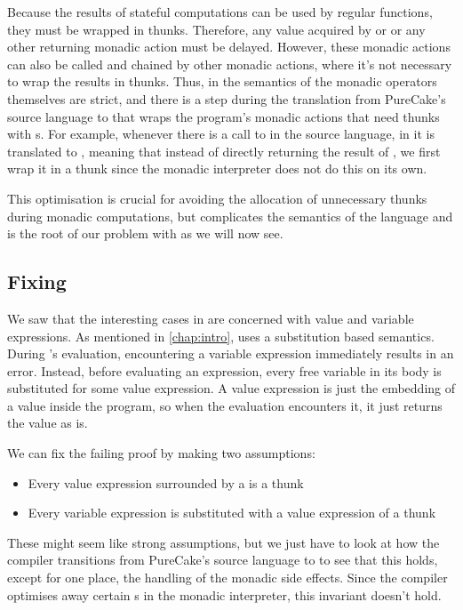 Because the results of stateful computations can be used by regular functions,
they must be wrapped in thunks. Therefore, any value acquired by  or
 or any other returning monadic action must be delayed. However,
these monadic actions can also be called and chained by other monadic actions,
where it's not necessary to wrap the results in thunks. Thus, in \ThunkLang{}
the semantics of the monadic operators themselves are strict, and there is a
step during the translation from PureCake's source language to \ThunkLang{} that
wraps the program's monadic actions that need thunks with s. For
example, whenever there is a call to  in the source language, in
\ThunkLang{} it is translated to ,
meaning that instead of directly returning the result of , we first
wrap it in a thunk since the monadic interpreter does not do this on its own.

This optimisation is crucial for avoiding the allocation of unnecessary thunks
during monadic computations, but complicates the semantics of the language and
is the root of our problem with  as we will now see.

\subsection {Fixing }

We saw that the interesting cases in  are concerned with value
and variable expressions. As mentioned in \autoref{chap:intro}, \ThunkLang{}
uses a substitution based semantics. During \ThunkLang{}'s evaluation,
encountering a variable expression immediately results in an error. Instead,
before evaluating an expression, every free variable in its body is substituted
for some value expression. A value expression is just the embedding of a value
inside the program, so when the evaluation encounters it, it just returns the
value as is.

We can fix the failing proof by making two assumptions:
\begin{itemize}
\item Every value expression surrounded by a  is a thunk
\item Every variable expression is substituted with a value expression of a
  thunk
\end{itemize}
These might seem like strong assumptions, but we just have to look at how the
compiler transitions from PureCake's source language to \ThunkLang{} to see that
this holds, except for one place, the handling of the monadic side effects.
Since the compiler optimises away certain s in the monadic
interpreter, this invariant doesn't hold.

